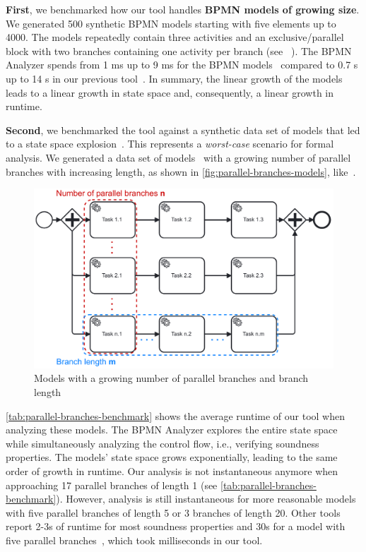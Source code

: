 \documentclass[
onecolumn, %
]{ceurart}
\begin{document}
\textbf{First}, we benchmarked how our tool handles \textbf{BPMN models of growing size}.
We generated 500 synthetic BPMN models starting with five elements up to 4000.
The models repeatedly contain three activities and an exclusive/parallel block with two branches containing one activity per branch (see ~\cite{krauterInstantaneousComprehensibleFixable2024}).
The BPMN Analyzer spends from 1 ms up to 9 ms for the BPMN models~\cite{krauterInstantaneousComprehensibleFixable2024} compared to 0.7 s up to 14 s in our previous tool~\cite{krauterHigherorderTransformationApproach2024}.
In summary, the linear growth of the models leads to a linear growth in state space and, consequently, a linear growth in runtime.

\textbf{Second}, we benchmarked the tool against a synthetic data set of models that led to a state space explosion~\cite{clarkeHandbookModelChecking2018}.
This represents a \textit{worst-case} scenario for formal analysis.
We generated a data set of models~\cite{krauterInstantaneousComprehensibleFixable2024} with a growing number of parallel branches with increasing length, as shown in \autoref{fig:parallel-branches-models}, like~\cite{corradiniFormalApproachAnalysis2021}.

\begin{figure}[ht]
	\centering
	\includegraphics[width=0.5\linewidth]{images/parallel-branches}
	\caption{Models with a growing number of parallel branches and branch length}
	\label{fig:parallel-branches-models}
\end{figure}

\autoref{tab:parallel-branches-benchmark} shows the average runtime of our tool when analyzing these models.
The BPMN Analyzer explores the entire state space while simultaneously analyzing the control flow, i.e., verifying soundness properties.
The models' state space grows exponentially, leading to the same order of growth in runtime.
Our analysis is not instantaneous anymore when approaching 17 parallel branches of length 1 (see \autoref{tab:parallel-branches-benchmark}).
However, analysis is still instantaneous for more reasonable models with five parallel branches of length 5 or 3 branches of length 20.
Other tools report 2-3s of runtime for most soundness properties and 30s for a model with five parallel branches~\cite{corradiniFormalApproachAnalysis2021}, which took milliseconds in our tool.
\end{document}
